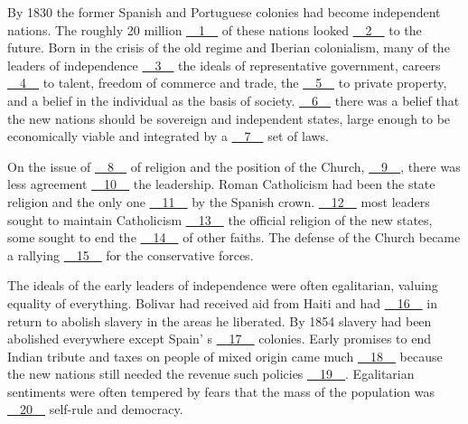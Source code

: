 By 1830 the former Spanish and Portuguese colonies had become independent nations. The roughly 20 million \uline{~~1~~} of these nations looked \uline{~~2~~} to the future. Born in the crisis of the old regime and Iberian colonialism, many of the leaders of independence \uline{~~3~~} the ideals of representative government, careers \uline{~~4~~} to  talent, freedom of commerce and trade, the \uline{~~5~~} to private property, and a belief in the individual as the basis of society. \uline{~~6~~} there was a belief that the new nations should be sovereign and independent states, large enough to be economically viable and integrated by a \uline{~~7~~} set of laws.


On the issue of \uline{~~8~~} of religion and the position of the Church, \uline{~~9~~},   there was less agreement \uline{~~10~~} the leadership. Roman Catholicism had been  the state religion and the only one \uline{~~11~~} by the Spanish crown. \uline{~~12~~} most leaders sought to maintain Catholicism \uline{~~13~~} the official religion of the new states, some sought to end the \uline{~~14~~} of other faiths. The defense of the Church  became a rallying \uline{~~15~~} for the conservative forces.


The ideals of the early leaders of independence were often egalitarian, valuing equality of everything. Bolivar had received aid from Haiti and had \uline{~~16~~} in return to abolish slavery in the areas he liberated. By 1854 slavery had been abolished everywhere except Spain' s \uline{~~17~~} colonies. Early promises to end Indian tribute  and taxes on people of mixed origin came much \uline{~~18~~} because the new nations still needed the revenue such policies \uline{~~19~~}. Egalitarian sentiments were often tempered by fears that the mass of the population was \uline{~~20~~} self-rule and democracy.